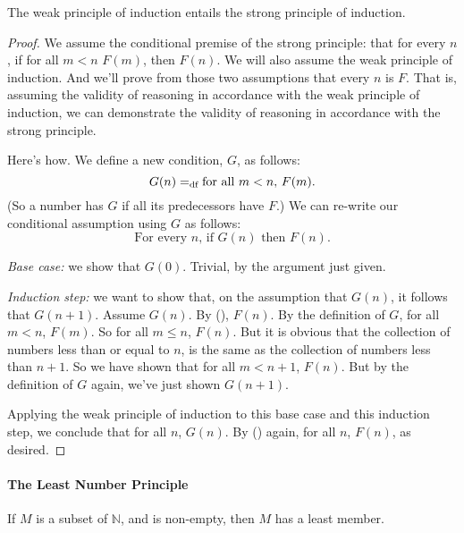 \begin{theorem} The weak principle of induction entails the strong principle of induction.
  \begin{proof}
    We assume the conditional premise of the strong principle: that for every $n$, if for all $m < n$ $F(m)$, then $F(n)$. We will also assume the weak principle of induction. And we'll prove from those two assumptions that every $n$ is $F$. That is, assuming the validity of reasoning in accordance with the weak principle of induction, we can demonstrate the validity of reasoning in accordance with the strong principle.

    Here's how. We define a new condition, $G$, as follows: $$G(n) =_{\text{df}} \text{for all $m < n$, $F(m)$}.$$ (So a number has $G$ if all its predecessors have $F$.) We can re-write our conditional assumption using $G$ as follows: \begin{equation*}\tag{\dag}
      \text{For every $n$, if $G(n)$ then $F(n)$.}
    \end{equation*}

    \emph{Base case:} we show that $G(0)$. Trivial, by the argument just given.

    \emph{Induction step:} we want to show that, on the assumption that $G(n)$, it follows that $G(n+1)$. Assume $G(n)$. By (\dag), $F(n)$. By the definition of $G$, for all $m<n$, $F(m)$. So for all $m\leqslant n$, $F(n)$. But it is obvious that the collection of numbers less than or equal to $n$, is the same as the collection of numbers less than $n+1$. So we have shown that  for all $m< n+1$, $F(n)$. But by the definition of $G$ again, we've just shown $G(n+1)$. 

    Applying the weak principle of induction to this base case and this induction step, we conclude that for all $n$, $G(n)$. By (\dag) again, for all $n$, $F(n)$, as desired.
  \end{proof}
\end{theorem}



\paragraph{The Least Number Principle}

\begin{definition} If $M$ is a subset of
  $\mathbb{N}$, and is non-empty, then $M$ has a least
  member.\end{definition}

